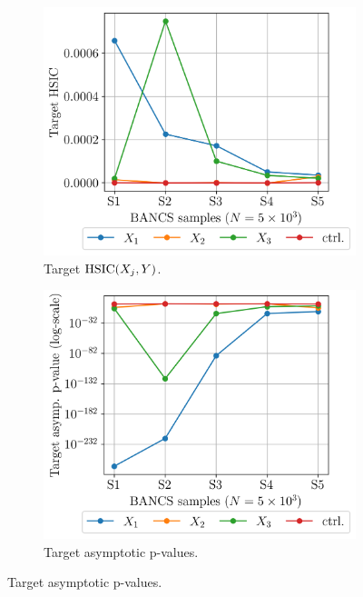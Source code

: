 \begin{figure}
    \centering
    \begin{subfigure}[b]{0.48\linewidth}
        \centering
        \includegraphics[width=\linewidth]{part3/figures/BANCS/ishigami_THSIC.png}
        \caption{Target $\mathrm{HSIC}(X_j, Y)$.}
    \end{subfigure}
    \begin{subfigure}[b]{0.48\linewidth}
        \centering
        \includegraphics[width=\linewidth]{part3/figures/BANCS/ishigami_Tpvalue_asymptotic.png}
        \caption{Target asymptotic p-values.}
    \end{subfigure}

\end{figure}

